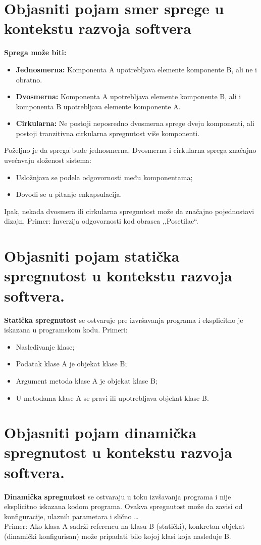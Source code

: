 \documentclass[a4paper]{article}
\begin{document}
\section{Objasniti pojam smer sprege u kontekstu razvoja softvera}
  \noindent \textbf{Sprega može biti:}
  \begin{itemize}
    \item \textbf{Jednosmerna:} Komponenta A upotrebljava elemente komponente B, ali ne i
          obratno.
    \item \textbf{Dvosmerna:} Komponenta A upotrebljava elemente komponente B, ali i komponenta B
          upotrebljava elemente komponente A.
    \item \textbf{Cirkularna:} Ne postoji neposredno dvosmerna sprege dveju komponenti, ali 
          postoji tranzitivna cirkularna spregnutost više komponenti.
  \end{itemize}
  Poželjno je da sprega bude jednosmerna. Dvosmerna i cirkularna sprega značajno uvećavaju složenost
  sistema:
  \begin{itemize}
    \item Usložnjava se podela odgovornosti među komponentama;
    \item Dovodi se u pitanje enkapsulacija.
  \end{itemize}
  Ipak, nekada dvosmera ili cirkularna spregnutost može da značajno pojednostavi dizajn. Primer:
  Inverzija odgovornosti kod obrasca ,,Posetilac``.
  
\section{Objasniti pojam statička spregnutost u kontekstu razvoja softvera.}
  \textbf{Statička spregnutost} se ostvaruje pre izvršavanja programa i eksplicitno je iskazana
  u programskom kodu. Primeri:
  \begin{itemize}
    \item Nasleđivanje klase;
    \item Podatak klase A je objekat klase B;
    \item Argument metoda klase A je objekat klase B;
    \item U metodama klase A se pravi ili upotrebljava objekat klase B.
  \end{itemize}

\section{Objasniti pojam dinamička spregnutost u kontekstu razvoja softvera.}
  \textbf{Dinamička spregnutost} se ostvaraju u toku izvšavanja programa i nije eksplicitno
  iskazana kodom programa. Ovakva spregnutost može da zavisi od konfiguracije, ulaznih parametara
  i slično \dots \\ 
  \indent Primer: Ako klasa A sadrži referencu na klasu B (statički), konkretan objekat 
  (dinamički konfigurisan) može pripadati bilo kojoj klasi koja nasleđuje B.
\end{document}
